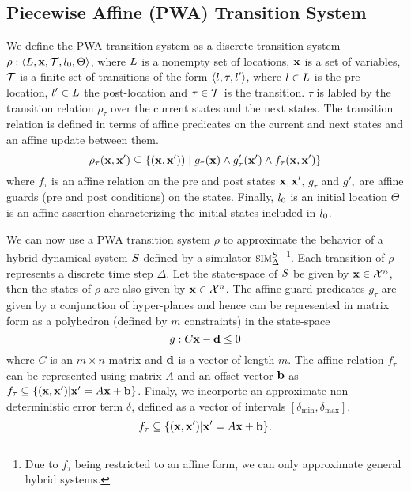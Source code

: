 \subsection{Piecewise Affine (PWA) Transition System}

We define the PWA transition system as a discrete transition system
$\rho:\left\langle L,\mathbf{x},\mathcal{T}, l_0,\Theta \right \rangle$, where $L$ is
a nonempty set of locations, $\mathbf{x}$ is a set of variables, $\mathcal{T}$
is a finite set of transitions of the form $\left\langle l, \tau,
l' \right \rangle$, where $l\in L$ is the pre-location, $l'\in L$ the
post-location and $\tau \in \mathcal{T}$ is the transition. $\tau$
is labled by the transition relation $\rho_{\tau}$
over the current states and the next states. The transition relation
is defined in terms of affine predicates on the current and next
states and an affine update between them.
\[
    \rho_{\tau}(\mathbf{x},\mathbf{x}') \subseteq \{(\mathbf{x},\mathbf{x}')) \;|\;
    g_\tau(\mathbf{x}) \land g'_\tau(\mathbf{x}') \land f_{\tau}(\mathbf{x}, \mathbf{x}')\}
\]
where $f_{\tau}$ is an affine relation on the pre and post states
$\mathbf{x},\mathbf{x}'$, $g_{\tau}$ and $g'_{\tau}$ are affine guards (pre and
post conditions) on the states. Finally, $l_0$ is an initial
location $\Theta$ is an affine assertion characterizing the initial
states included in $l_0$.





We can now use a PWA transition system $\rho$ to approximate the
behavior of a hybrid dynamical system $S$ defined by a simulator
$\mbox{\sc sim}_\Delta^{S}$~\footnote{Due to $f_\tau$ being restricted to an affine
form, we can only approximate general hybrid systems.}. Each
transition of $\rho$ represents a discrete time step $\Delta$. Let the
state-space of $S$ be given by $\mathbf{x}\in\mathcal{X}^n$, then the
states of $\rho$ are also given by $\mathbf{x}\in\mathcal{X}^n$. The affine guard
predicates $g_\tau$ are given by a conjunction of hyper-planes and
hence can be represented in matrix form as a polyhedron (defined by
$m$ constraints) in the state-space
\[
g:C\mathbf{x} - \mathbf{d} \le 0
\]
where $C$ is an $m \times n$ matrix and $\mathbf{d}$ is a vector of length
$m$. The affine relation $f_\tau$ can be represented using matrix $A$
and an offset vector $\mathbf{b}$ as $f_\tau \subseteq \{(\mathbf{x},\mathbf{x}') | \mathbf{x}'
= A\mathbf{x}+\mathbf{b}\}$. Finaly, we incorporte an approximate non-deterministic
error term $\delta$, defined as a vector of intervals
$[\delta_{\min},\delta_{\max}]$.
\[
    f_\tau \subseteq \{(\mathbf{x},\mathbf{x}') | \mathbf{x}' = A\mathbf{x}+\mathbf{b}\}.
\]


